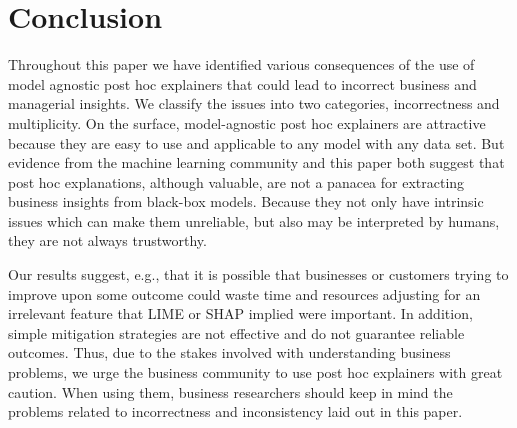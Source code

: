 \documentclass[11pt]{article}    %
\begin{document}
\section{Conclusion}
Throughout this paper we have identified various consequences of the use of model agnostic post hoc explainers that could lead to incorrect business and managerial insights. We classify the issues into two categories, incorrectness and multiplicity.  On the surface, model-agnostic post hoc explainers are attractive because they are easy to use and applicable to any model with any data set. But evidence from the machine learning community and this paper both suggest that post hoc explanations, although valuable, are not a panacea for extracting business insights from black-box models. Because they not only have intrinsic issues which can make them unreliable, but also may be interpreted by humans, they are not always trustworthy.  

Our results suggest, e.g., that it is possible that businesses or customers trying to improve upon some outcome could waste time and resources adjusting for an irrelevant feature that LIME or SHAP implied were important. In addition, simple mitigation strategies are not effective and do not guarantee reliable outcomes. Thus, due to the stakes involved with understanding business problems, we urge the business community to use post hoc explainers with great caution. When using them, business researchers should keep in mind the problems related to incorrectness and inconsistency laid out in this paper. %

        






\clearpage



\end{document}
